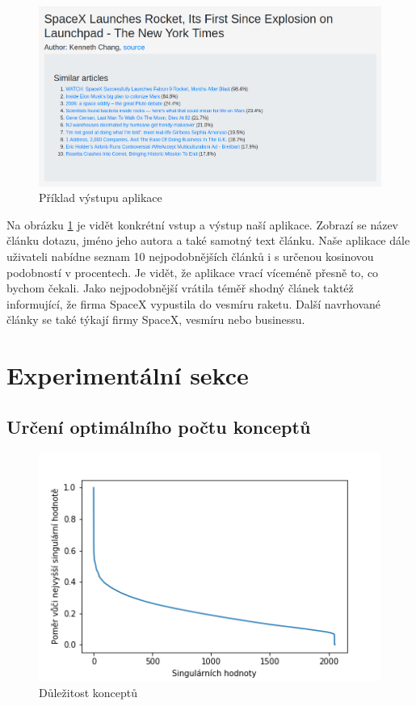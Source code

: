 \documentclass[11pt]{scrartcl} %
\begin{document}
\begin{figure}[h] %
	\centering
	\includegraphics[width=0.9\columnwidth]{images/output.png}
	\caption{Příklad výstupu aplikace}
	\label{fig:output}
\end{figure}

Na obrázku \ref{fig:output} je vidět konkrétní vstup a výstup naší aplikace. Zobrazí se název článku dotazu, jméno jeho autora a také samotný text článku. Naše aplikace dále uživateli nabídne seznam 10 nejpodobnějších článků i s určenou kosinovou podobností v procentech. Je vidět, že aplikace vrací víceméně přesně to, co bychom čekali. Jako nejpodobnější vrátila téměř shodný článek taktéž informující, že firma SpaceX vypustila do vesmíru raketu. Další navrhované články se také týkají firmy SpaceX, vesmíru nebo businessu. 

\section{Experimentální sekce}

\subsection{Určení optimálního počtu konceptů}

\begin{figure}[h] %
	\centering
	\includegraphics[width=0.7\columnwidth]{images/singular_values.png}
	\caption{Důležitost konceptů}
	\label{fig:concepts}
\end{figure}
\end{document}
